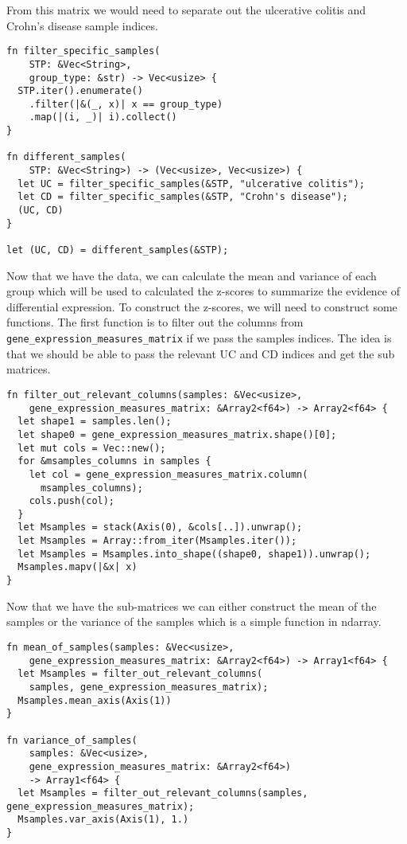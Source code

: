 \documentclass{book}
\begin{document}
From this matrix we would need to separate out the ulcerative colitis and Crohn's disease sample indices.

\begin{lstlisting}[caption={chapter7/statistics/src/main.rs}, basicstyle=\small]
fn filter_specific_samples(
    STP: &Vec<String>,
    group_type: &str) -> Vec<usize> {
  STP.iter().enumerate()
    .filter(|&(_, x)| x == group_type)
    .map(|(i, _)| i).collect()
}

fn different_samples(
    STP: &Vec<String>) -> (Vec<usize>, Vec<usize>) {
  let UC = filter_specific_samples(&STP, "ulcerative colitis");
  let CD = filter_specific_samples(&STP, "Crohn's disease");
  (UC, CD)
}

let (UC, CD) = different_samples(&STP);
\end{lstlisting}

Now that we have the data, we can calculate the mean and variance of each group which will be used to calculated the z-scores to summarize the evidence of differential expression. To construct the z-scores, we will need to construct some functions. The first function is to filter out the columns from \lstinline{gene_expression_measures_matrix} if we pass the samples indices. The idea is that we should be able to pass the relevant UC and CD indices and get the sub matrices.

\begin{lstlisting}[caption={chapter7/statistics/src/main.rs}, basicstyle=\small]
fn filter_out_relevant_columns(samples: &Vec<usize>,
    gene_expression_measures_matrix: &Array2<f64>) -> Array2<f64> {
  let shape1 = samples.len();
  let shape0 = gene_expression_measures_matrix.shape()[0];
  let mut cols = Vec::new();
  for &msamples_columns in samples {
    let col = gene_expression_measures_matrix.column(
      msamples_columns);
    cols.push(col);
  }
  let Msamples = stack(Axis(0), &cols[..]).unwrap();
  let Msamples = Array::from_iter(Msamples.iter());
  let Msamples = Msamples.into_shape((shape0, shape1)).unwrap();
  Msamples.mapv(|&x| x)
}
\end{lstlisting}

Now that we have the sub-matrices we can either construct the mean of the samples or the variance of the samples which is a simple function in ndarray.

\begin{lstlisting}[caption={chapter7/statistics/src/main.rs}, basicstyle=\small]
fn mean_of_samples(samples: &Vec<usize>,
    gene_expression_measures_matrix: &Array2<f64>) -> Array1<f64> {
  let Msamples = filter_out_relevant_columns(
    samples, gene_expression_measures_matrix);
  Msamples.mean_axis(Axis(1))
}

fn variance_of_samples(
    samples: &Vec<usize>,
    gene_expression_measures_matrix: &Array2<f64>)
    -> Array1<f64> {
  let Msamples = filter_out_relevant_columns(samples, gene_expression_measures_matrix);
  Msamples.var_axis(Axis(1), 1.)
}
\end{lstlisting}
\end{document}
